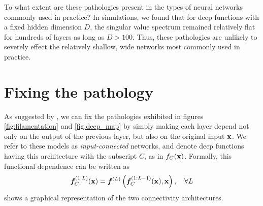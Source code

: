 To what extent are these pathologies present in the types of neural networks commonly used in practice?
In simulations, we found that for deep functions with a fixed hidden dimension $D$, the singular value spectrum remained relatively flat for hundreds of layers as long as $D > 100$.
Thus, these pathologies are unlikely to severely effect the relatively shallow, wide networks most commonly used in practice.





\section{Fixing the pathology}
\label{sec:fix}

As suggested by \citet[chapter 2]{neal1995bayesian}, we can fix the pathologies exhibited in figures \cref{fig:filamentation} and \ref{fig:deep_map} by simply making each layer depend not only on the output of the previous layer, but also on the original input ${\bf{x}}$.  
We refer to these models as \emph{input-connected} networks, and denote deep functions having this architecture with the subscript $C$, as in $f_C({\bf{x}})$.
Formally, this functional dependence can be written as
\begin{align}
\boldsymbol{f}_C^{(1:L)}({\bf{x}}) = \boldsymbol{f}^{(L)} \left( \boldsymbol{f}_C^{(1:L-1)}({\bf{x}}), {\bf{x}} \right), \quad \forall L
\end{align}
%
 shows a graphical representation of the two connectivity architectures.

